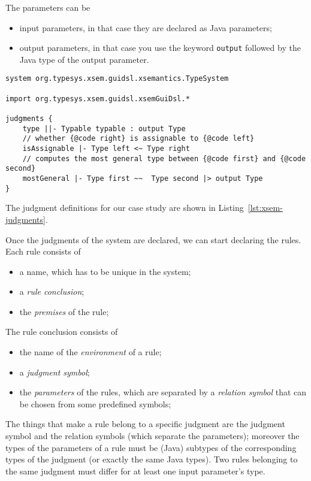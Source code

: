 \noindent
The parameters can be

\begin{itemize}
\item 
input parameters, in that case they are declared as Java parameters;
\item 
output parameters, in that case you use the keyword
\verb|output| followed by the Java
type of the output parameter.
\end{itemize}

\begin{lstlisting}[language=xsemantics,float,label=lst:xsem-judgments,caption=Judgment
definitions in Xsemantics]
system org.typesys.xsem.guidsl.xsemantics.TypeSystem

import org.typesys.xsem.guidsl.xsemGuiDsl.*

judgments {
	type ||- Typable typable : output Type
	// whether {@code right} is assignable to {@code left}
	isAssignable |- Type left <~ Type right
	// computes the most general type between {@code first} and {@code second}
	mostGeneral |- Type first ~~  Type second |> output Type
}
\end{lstlisting}

\noindent
The judgment definitions for our case study are shown in
Listing~\ref{lst:xsem-judgments}.

Once the judgments of the system are declared, we can start declaring the
rules.  Each rule consists of

\begin{itemize}
\item
a name, which has to be unique in the system;
\item
a \textit{rule conclusion};
\item
the \textit{premises} of the rule;
\end{itemize}

\noindent
The rule conclusion consists of

\begin{itemize}
\item
the name of the \textit{environment} of a rule;
\item
a \textit{judgment symbol};
\item
the \textit{parameters} of the rules, which are separated by
a \textit{relation symbol} that can be chosen from some predefined symbols;
\end{itemize}

The things that make a rule belong to a specific judgment are the judgment
symbol and the relation symbols (which separate the parameters); moreover the
types of the parameters of a rule must be (Java) subtypes of the corresponding types
of the judgment (or exactly the same Java types).  Two rules belonging to the
same judgment must differ for at least one input parameter's type.

